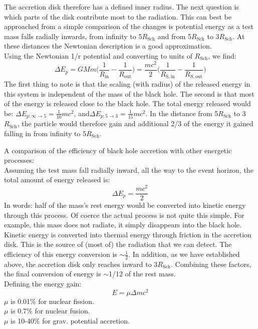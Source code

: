 \documentclass[11pt]{article}
\begin{document}
\noindent
The accretion disk therefore has a defined inner radius. The next question is which parts of the disk contribute most to the radiation. This can best be approached from a simple comparison of the changes is potential energy as a test mass falls radially inwards, from infinity to 5$R_\mathrm{Sch}$ and from 5$R_\mathrm{Sch}$ to 3$R_\mathrm{Sch}$. At these distances the Newtonian description is a good approximation.\\
\indent Using the Newtonian 1/r potential and converting to units of $R_{\mathrm{Sch}}$, we find:
\begin{equation}
  \Delta E_{p} = G M m\Bigg(\frac{1}{R_{\mathrm{in}}} - \frac{1}{R_{\mathrm{out}}}\Bigg) = \frac{mc^2}{2}\Bigg(\frac{1}{R_{\mathrm{S,in}}} - \frac{1}{R_{S,\mathrm{out}}}\Bigg)
\end{equation}
The first thing to note is that the scaling (with radius) of the released energy in this system is independent of the mass of the black hole. The second is that most of the energy is released close to the black hole. The total energy released would be: $\Delta E_{p:\infty\rightarrow 5} = \frac{1}{10}mc^2$, and$\Delta E_{p:5\rightarrow 3} = \frac{1}{15}mc^2$. In the distance from 5$R_{\mathrm{Sch}}$ to 3$R_{\mathrm{Sch}}$, the particle would therefore gain and additional 2/3 of the energy it gained falling in from infinity to 5$R_{\mathrm{Sch}}$.\\
\begin{framed}
\noindent
A comparison of the efficiency of black hole accretion with other energetic processes:\\

\noindent
Assuming the test mass fall radially inward, all the way to the event horizon, the total amount of energy released is:
$$
\Delta E_p = \frac{mc^2}{2}
$$
\noindent
In words: half of the mass's rest energy would be converted into kinetic energy through this process. Of coerce the actual process is not quite this simple. For example, this mass does not radiate, it simply disappears into the black hole. Kinetic energy is converted into thermal energy through friction in the accretion disk. This is the source of (most of) the radiation that we can detect. The efficiency of this energy conversion is $\sim\frac{1}{2}$. In addition, as we have established above, the accretion disk only reaches inward to 3$R_{\mathrm{Sch}}$. Combining these factors, the final conversion of energy is $\sim$1/12 of the rest mass.\\
Defining the energy gain:
\begin{equation}
 E = \mu \Delta m c^{2} 
\end{equation}
$\mu$ is 0.01\% for nuclear fission.\\
$\mu$ is 0.7\% for nuclear fusion. \\
$\mu$ is 10-40\% for grav. potential accretion.\\
\end{framed}
\end{document}
